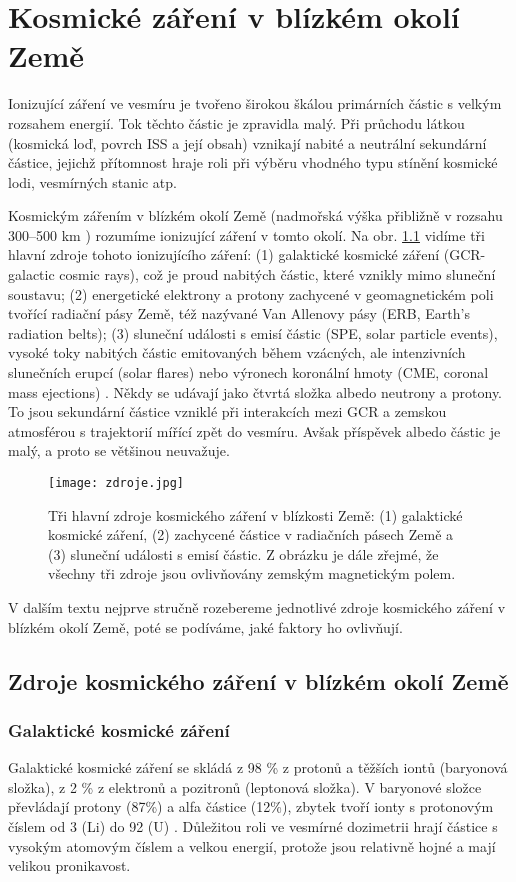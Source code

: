 \chapter{Kosmické záření v blízkém okolí Země}
Ionizující záření ve vesmíru je tvořeno širokou škálou primárních částic s velkým rozsahem energií. Tok těchto částic je zpravidla malý. Při průchodu látkou (kosmická loď, povrch ISS a její obsah) vznikají nabité a neutrální sekundární částice, jejichž přítomnost hraje roli při výběru vhodného typu stínění kosmické lodi, vesmírných stanic atp.   

Kosmickým zářením v blízkém okolí Země (nadmořská výška přibližně v rozsahu 300--500 km \cite{japonsky}) rozumíme ionizující záření v tomto okolí. Na obr. \ref{fig:zdroje} vidíme tři hlavní zdroje tohoto ionizujícího záření: (1) galaktické kosmické záření (GCR-galactic cosmic rays), což je proud nabitých částic, které vznikly mimo sluneční soustavu; (2) energetické elektrony a protony zachycené v geomagnetickém poli tvořící radiační pásy Země, též nazývané Van Allenovy pásy (ERB, Earth's radiation belts); (3) sluneční události s emisí částic (SPE, solar particle events), vysoké toky nabitých částic emitovaných během vzácných, ale intenzivních slunečních erupcí (solar flares) nebo výronech koronální hmoty (CME, coronal mass ejections) \cite{benton}. Někdy se udávají jako čtvrtá
složka albedo neutrony a protony. To jsou sekundární částice vzniklé při interakcích mezi GCR a zemskou atmosférou s trajektorií mířící zpět do vesmíru. Avšak příspěvek albedo částic je malý, a proto se většinou neuvažuje.

\begin{figure}[ht]
  \centering
  \texttt{[image: zdroje.jpg]}
  \caption{Tři hlavní zdroje kosmického záření v blízkosti Země: (1) galaktické kosmické záření, (2) zachycené částice v radiačních pásech Země a (3) sluneční události s emisí částic. Z obrázku je dále zřejmé, že všechny tři zdroje jsou ovlivňovány zemským magnetickým polem. \cite{benton}}
  \label{fig:zdroje}
\end{figure}

V dalším textu nejprve stručně rozebereme jednotlivé zdroje kosmického záření v blízkém okolí Země, poté se podíváme, jaké faktory ho ovlivňují.
\section{Zdroje kosmického záření v blízkém okolí Země}
\subsection{Galaktické kosmické záření}
Galaktické kosmické záření se skládá z 98 \% z protonů a těžších iontů (baryonová složka), z 2 \% z elektronů a pozitronů (leptonová složka). V baryonové složce převládají protony (87\%) a alfa částice (12\%), zbytek tvoří ionty s protonovým číslem od 3 (Li) do 92 (U) \cite{benton}. Důležitou roli ve vesmírné dozimetrii hrají částice s vysokým atomovým číslem a velkou energií, protože jsou relativně hojné a mají velikou pronikavost.

